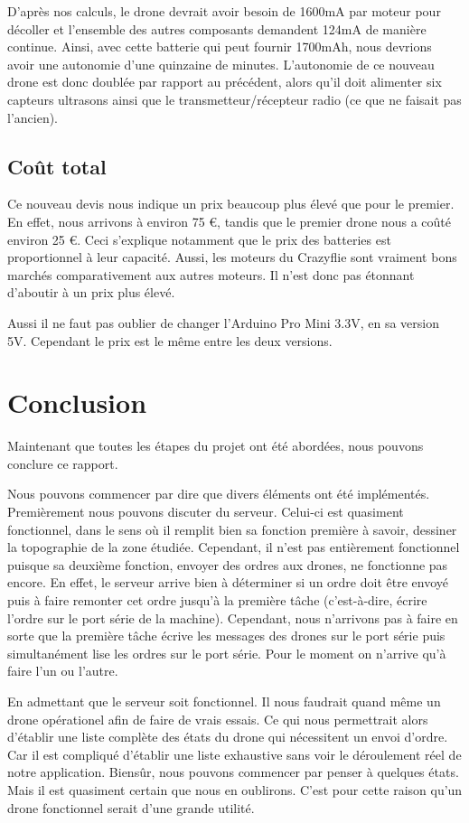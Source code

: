 \documentclass[a4paper,10pt]{report}
\begin{document}
      D'après nos calculs, le drone devrait avoir besoin de 1600mA par moteur 
pour décoller et l'ensemble des autres composants demandent 124mA de manière 
continue. Ainsi, avec cette batterie qui peut fournir 1700mAh, nous devrions 
avoir une autonomie d'une quinzaine de minutes. L'autonomie de ce nouveau drone 
est donc doublée par rapport au précédent, alors qu'il doit alimenter six 
capteurs ultrasons ainsi que le transmetteur/récepteur radio (ce que ne faisait 
pas l'ancien).

    \section{Coût total}
      Ce nouveau devis nous indique un prix beaucoup plus élevé que pour le 
premier. En effet, nous arrivons à environ 75 \euro, tandis que le premier 
drone nous a coûté environ 25 \euro. Ceci s'explique notamment que le prix des 
batteries est proportionnel à leur capacité. Aussi, les moteurs du Crazyflie 
sont vraiment bons marchés comparativement aux autres moteurs. Il n'est donc 
pas étonnant d'aboutir à un prix plus élevé.

      Aussi il ne faut pas oublier de changer l'Arduino Pro Mini 3.3V, en sa 
version 5V. Cependant le prix est le même entre les deux versions.
  
  \chapter{Conclusion}
    Maintenant que toutes les étapes du projet ont été abordées, nous pouvons 
conclure ce rapport.

    Nous pouvons commencer par dire que divers éléments ont été implémentés. 
Premièrement nous pouvons discuter du serveur. Celui-ci est quasiment 
fonctionnel, dans le sens où il remplit bien sa fonction première à savoir, 
dessiner la topographie de la zone étudiée. Cependant, il n'est pas entièrement 
fonctionnel puisque sa deuxième fonction, envoyer des ordres aux drones, ne 
fonctionne pas encore. En effet, le serveur arrive bien à déterminer si un ordre 
doit être envoyé puis à faire remonter cet ordre jusqu'à la première tâche 
(c'est-à-dire, écrire l'ordre sur le port série de la machine). Cependant, nous 
n'arrivons pas à faire en sorte que la première tâche écrive les messages des 
drones sur le port série puis simultanément lise les ordres sur le port série. 
Pour le moment on n'arrive qu'à faire l'un ou l'autre.

    En admettant que le serveur soit fonctionnel. Il nous faudrait quand même 
un drone opérationel afin de faire de vrais essais. Ce qui nous permettrait 
alors d'établir une liste complète des états du drone qui nécessitent un envoi 
d'ordre. Car il est compliqué d'établir une liste exhaustive sans voir le 
déroulement réel de notre application. Biensûr, nous pouvons commencer par 
penser à quelques états. Mais il est quasiment certain que nous en oublirons. 
C'est pour cette raison qu'un drone fonctionnel serait d'une grande utilité. 
\end{document}
